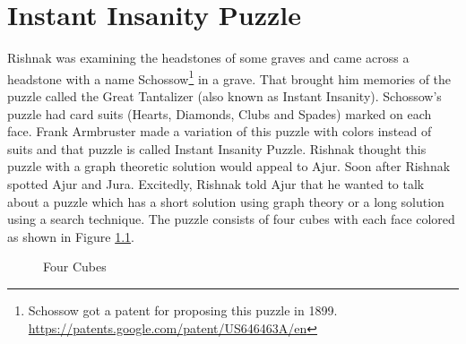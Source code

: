 \chapter{Instant Insanity Puzzle}

Rishnak was examining the headstones of some graves and came across a headstone with a name Schossow\footnote{ Schossow got a patent for proposing this puzzle in 1899. \url{https://patents.google.com/patent/US646463A/en} }  in a grave. That brought him memories of the puzzle called the Great Tantalizer (also known as Instant Insanity). Schossow's puzzle had card suits (Hearts, Diamonds, Clubs and Spades) marked on each face. Frank Armbruster made a variation of this puzzle with colors instead of suits and that puzzle is called Instant Insanity Puzzle.
Rishnak thought this puzzle with a graph theoretic solution would appeal to Ajur. Soon after Rishnak spotted Ajur and Jura. Excitedly, Rishnak told Ajur that he wanted to talk about a puzzle which has a short solution using graph theory or a long solution using a search technique. The puzzle consists of four cubes with each face colored as shown in Figure \ref{22p1}. 

\begin{newpage}
\end{newpage}
\begin{figure}
\begin{center}
\caption{ Four Cubes}\label{22p1}
\end{center}
\end{figure}

